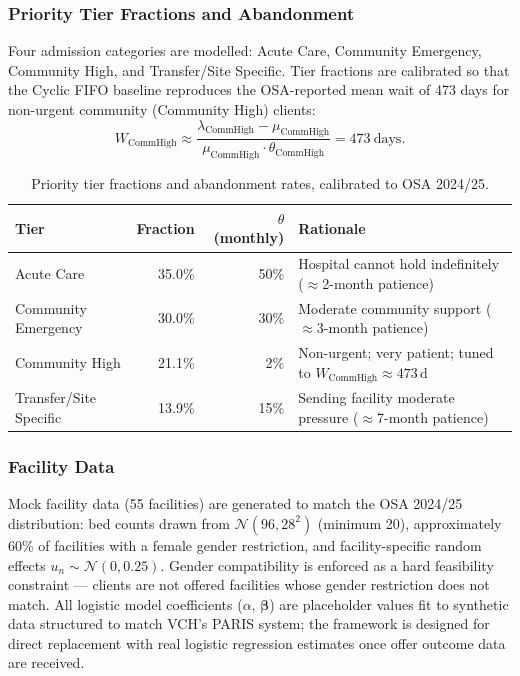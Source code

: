 \subsubsection*{Priority Tier Fractions and Abandonment}

Four admission categories are modelled: Acute Care, Community Emergency,
Community High, and Transfer/Site Specific.  Tier fractions are calibrated so that
the Cyclic FIFO baseline reproduces the OSA-reported mean wait of 473 days for
non-urgent community (Community High) clients:
\[
  W_{\mathrm{CommHigh}} \approx
  \frac{\lambda_{\mathrm{CommHigh}} - \mu_{\mathrm{CommHigh}}}
       {\mu_{\mathrm{CommHigh}} \cdot \theta_{\mathrm{CommHigh}}} = 473\ \text{days.}
\]

\begin{table}[H]
\centering
\caption{Priority tier fractions and abandonment rates, calibrated to OSA 2024/25.}
\label{tab:tier_fracs}
\begin{tabular}{lrrl}
\toprule
\textbf{Tier} & \textbf{Fraction} & \textbf{$\theta$ (monthly)} & \textbf{Rationale} \\
\midrule
Acute Care             & 35.0\% & 50\% & Hospital cannot hold indefinitely ($\approx$2-month patience) \\
Community Emergency    & 30.0\% & 30\% & Moderate community support ($\approx$3-month patience) \\
Community High         & 21.1\% & 2\%  & Non-urgent; very patient; tuned to $W_{\text{CommHigh}} \approx 473$\,d \\
Transfer/Site Specific & 13.9\% & 15\% & Sending facility moderate pressure ($\approx$7-month patience) \\
\bottomrule
\end{tabular}
\end{table}

\subsubsection*{Facility Data}

Mock facility data (55 facilities) are generated to match the OSA 2024/25 distribution:
bed counts drawn from $\mathcal{N}(96, 28^2)$ (minimum 20), approximately 60\% of
facilities with a female gender restriction, and facility-specific random effects
$u_n \sim \mathcal{N}(0, 0.25)$.  Gender compatibility is enforced as a hard feasibility
constraint --- clients are not offered facilities whose gender restriction does not match.
All logistic model coefficients ($\alpha$, $\boldsymbol{\beta}$) are placeholder values
fit to synthetic data structured to match VCH's PARIS system; the framework is designed
for direct replacement with real logistic regression estimates once offer outcome data
are received.

